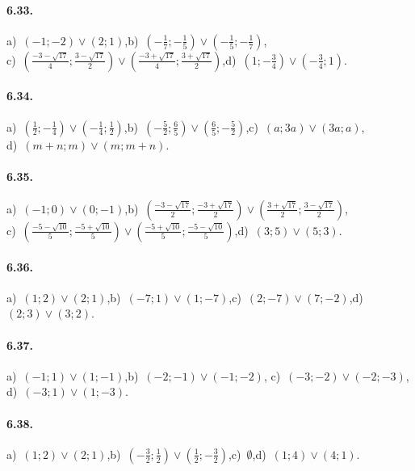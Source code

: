 \paragraph{6.33.} a)~$ (-1; -2)\vee(2;1) $,\quad b)~$\left(-\frac 1 7;-\frac 1 5\right)\vee\left(-\frac 1 5;-\frac 1 7\right)$,\protect\\ c)~$\left(\frac{-3-\sqrt{17}} 4;{\frac{3-\sqrt{17}} 2}\right)\vee \left(\frac{-3+\sqrt{17}} 4;{\frac{3+\sqrt{17}} 2}\right)$,\quad d)~$\left(1;-\frac 3 4\right)\vee\left(-\frac 3 4;1\right)$.

\paragraph{6.34.} a)~$\left(\frac 1 2;-\frac 1 4\right)\vee\left(-\frac 1 4;\frac 1 2\right)$,\quad b)~$\left(-\frac 5 2;\frac 6 5\right)\vee\left(\frac 6 5;-\frac 5 2\right)$,\quad c)~$(a;3a)\vee (3a;a)$,\protect\\ d)~$(m+n;m)\vee(m;m+n)$.

\paragraph{6.35.} a)~$(-1;0)\vee(0;-1)$,\quad b)~$\left(\frac{-3-\sqrt{17}} 2;\frac{-3+\sqrt{17}} 2\right)\vee\left(\frac{3+\sqrt{17}} 2;\frac{3-\sqrt{17}} 2\right)$,\protect\\
\quad c)~$\left(\frac{-5-\sqrt{10}} 5;\frac{-5+\sqrt{10}} 5\right)\vee \left(\frac{-5+\sqrt{10}} 5;\frac{-5-\sqrt{10}} 5\right)$,\quad d)~$(3;5)\vee(5;3)$.

\paragraph{6.36.} a)~$(1;2)\vee(2;1)$,\quad b)~$(-7;1)\vee(1;-7)$,\quad c)~$(2;-7)\vee(7;-2)$,\quad d)~$(2;3)\vee(3;2)$.

\paragraph{6.37.} a)~$(-1;1)\vee(1;-1)$,\;b)~$(-2;-1)\vee(-1;-2)$,\; c)~$(-3;-2)\vee(-2;-3)$,\; d)~$(-3;1)\vee(1;-3)$.

\paragraph{6.38.} a)~$(1;2)\vee(2;1)$,\quad b)~$\left(-\frac 3 2;\frac 1 2\right)\vee\left(\frac 1 2;-\frac 3 2\right)$,\quad c)~$\emptyset$,\quad d)~$(1;4)\vee(4;1)$.


